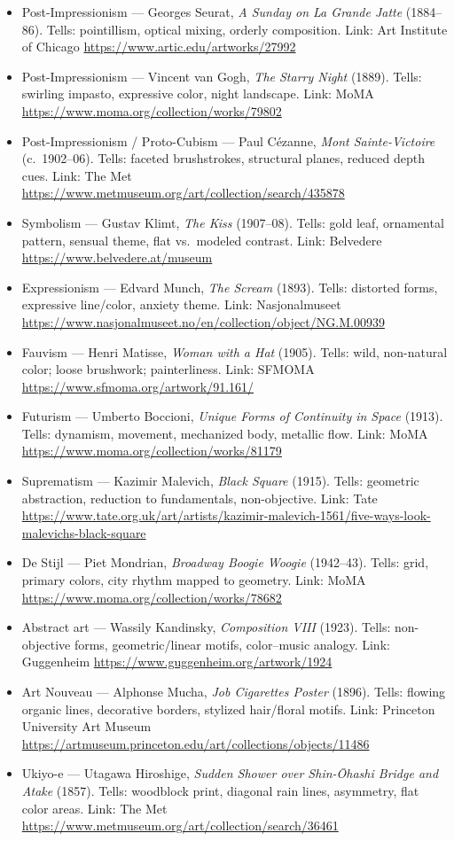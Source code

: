 \documentclass[12pt]{article}
\begin{document}
\begin{itemize}
  \item Post-Impressionism — Georges Seurat, \emph{A Sunday on La Grande Jatte} (1884–86). Tells: pointillism, optical mixing, orderly composition. Link: Art Institute of Chicago \url{https://www.artic.edu/artworks/27992}
  \item Post-Impressionism — Vincent van Gogh, \emph{The Starry Night} (1889). Tells: swirling impasto, expressive color, night landscape. Link: MoMA \url{https://www.moma.org/collection/works/79802}
  \item Post-Impressionism / Proto-Cubism — Paul Cézanne, \emph{Mont Sainte-Victoire} (c.\ 1902–06). Tells: faceted brushstrokes, structural planes, reduced depth cues. Link: The Met \url{https://www.metmuseum.org/art/collection/search/435878}
  \item Symbolism — Gustav Klimt, \emph{The Kiss} (1907–08). Tells: gold leaf, ornamental pattern, sensual theme, flat vs.\ modeled contrast. Link: Belvedere \url{https://www.belvedere.at/museum}
  \item Expressionism — Edvard Munch, \emph{The Scream} (1893). Tells: distorted forms, expressive line/color, anxiety theme. Link: Nasjonalmuseet \url{https://www.nasjonalmuseet.no/en/collection/object/NG.M.00939}
  \item Fauvism — Henri Matisse, \emph{Woman with a Hat} (1905). Tells: wild, non-natural color; loose brushwork; painterliness. Link: SFMOMA \url{https://www.sfmoma.org/artwork/91.161/}
  \item Futurism — Umberto Boccioni, \emph{Unique Forms of Continuity in Space} (1913). Tells: dynamism, movement, mechanized body, metallic flow. Link: MoMA \url{https://www.moma.org/collection/works/81179}
  \item Suprematism — Kazimir Malevich, \emph{Black Square} (1915). Tells: geometric abstraction, reduction to fundamentals, non-objective. Link: Tate \url{https://www.tate.org.uk/art/artists/kazimir-malevich-1561/five-ways-look-malevichs-black-square}
  \item De Stijl — Piet Mondrian, \emph{Broadway Boogie Woogie} (1942–43). Tells: grid, primary colors, city rhythm mapped to geometry. Link: MoMA \url{https://www.moma.org/collection/works/78682}
  \item Abstract art — Wassily Kandinsky, \emph{Composition VIII} (1923). Tells: non-objective forms, geometric/linear motifs, color–music analogy. Link: Guggenheim \url{https://www.guggenheim.org/artwork/1924}
  \item Art Nouveau — Alphonse Mucha, \emph{Job Cigarettes Poster} (1896). Tells: flowing organic lines, decorative borders, stylized hair/floral motifs. Link: Princeton University Art Museum \url{https://artmuseum.princeton.edu/art/collections/objects/11486}
  \item Ukiyo-e — Utagawa Hiroshige, \emph{Sudden Shower over Shin-Ōhashi Bridge and Atake} (1857). Tells: woodblock print, diagonal rain lines, asymmetry, flat color areas. Link: The Met \url{https://www.metmuseum.org/art/collection/search/36461}
\end{itemize}
\end{document}
